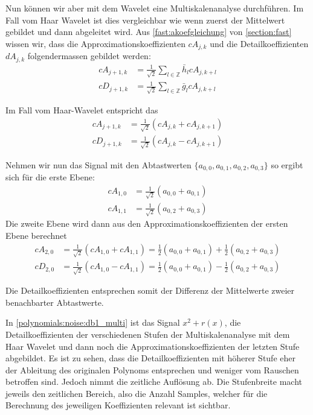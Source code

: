 \begin{refsection}
Nun können wir aber mit dem Wavelet eine Multiskalenanalyse durchführen. Im
Fall vom Haar Wavelet ist dies vergleichbar wie wenn zuerst der Mittelwert
gebildet und dann abgeleitet wird. Aus \autoref{fast:akoefgleichung} von
\autoref{section:fast} wissen wir, dass die Approximationskoeffizienten $cA_{j,k}$ und die Detailkoeffizienten $dA_{j,k}$
folgendermassen gebildet werden:
\begin{align}
cA_{j+1,k}
&=
\frac{1}{\sqrt{2}} \sum_{l\in\mathbb Z} \bar{h}_l cA_{j,k+l}
\\
cD_{j+1,k}
&=
\frac{1}{\sqrt{2}} \sum_{l\in\mathbb Z} \bar{g}_l cA_{j,k+l}
\end{align}

Im Fall vom Haar-Wavelet entspricht das
\begin{align}
cA_{j+1,k}
&=
\frac{1}{\sqrt{2}} (cA_{j,k} + cA_{j,k+1})
\\
cD_{j+1,k}
&=
\frac{1}{\sqrt{2}} (cA_{j,k} - cA_{j,k+1})
\end{align}

Nehmen wir nun das Signal mit den Abtastwerten $\{a_{0,0}, a_{0,1}, a_{0,2}, a_{0,3}\}$ so ergibt
sich für die erste Ebene:
\begin{align}
cA_{1,0}
&=
\frac{1}{\sqrt{2}} (a_{0,0} + a_{0,1})
\\
cA_{1,1}
&=
\frac{1}{\sqrt{2}} (a_{0,2} + a_{0,3})
\end{align}
Die zweite Ebene wird dann aus den Approximationskoeffizienten der ersten Ebene berechnet
\begin{align}
cA_{2,0}
&=
\frac{1}{\sqrt{2}} (cA_{1,0} + cA_{1,1})
=
\frac{1}{2} (a_{0,0} + a_{0,1}) + \frac{1}{2} (a_{0,2} + a_{0,3})
\\
cD_{2,0}
&=
\frac{1}{\sqrt{2}} (cA_{1,0} - cA_{1,1})
=
\frac{1}{2} (a_{0,0} + a_{0,1}) - \frac{1}{2} (a_{0,2} + a_{0,3})
\end{align}

Die Detailkoeffizienten entsprechen somit der Differenz der Mittelwerte zweier
benachbarter Abtastwerte.

In \autoref{polynomials:noise:db1_multi} ist das Signal $x^2 + r(x)$, die
Detailkoeffizienten der verschiedenen Stufen der Multiskalenanalyse mit dem
Haar Wavelet und dann noch die Approximationskoeffizienten der letzten Stufe
abgebildet. Es ist zu sehen, dass die Detailkoeffizienten mit höherer Stufe
eher der Ableitung des originalen Polynoms entsprechen und weniger vom Rauschen
betroffen sind. Jedoch nimmt die zeitliche Auflösung ab.
Die Stufenbreite macht jeweils den zeitlichen Bereich, also die Anzahl Samples,
welcher für die Berechnung des jeweiligen Koeffizienten relevant ist sichtbar.


\end{refsection}

